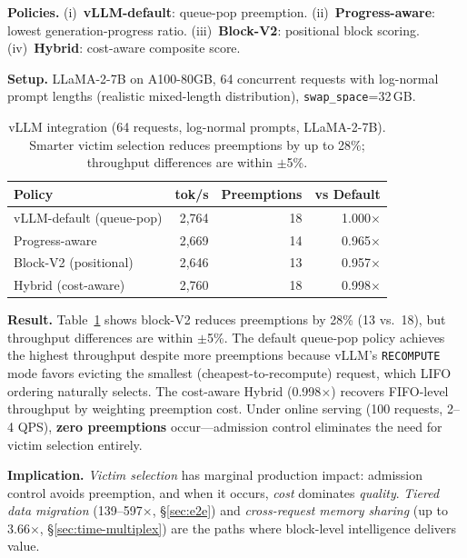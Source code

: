 \documentclass[conference]{IEEEtran}
\begin{document}
\textbf{Policies.} (i)~\textbf{vLLM-default}: queue-pop preemption. (ii)~\textbf{Progress-aware}: lowest generation-progress ratio. (iii)~\textbf{Block-V2}: positional block scoring. (iv)~\textbf{Hybrid}: cost-aware composite score.

\textbf{Setup.} LLaMA-2-7B on A100-80GB, 64 concurrent requests with log-normal prompt lengths (realistic mixed-length distribution), \texttt{swap\_space}=32\,GB.

\begin{table}[t]
\centering
\caption{vLLM integration (64 requests, log-normal prompts, LLaMA-2-7B). Smarter victim selection reduces preemptions by up to 28\%; throughput differences are within $\pm$5\%.}
\label{tab:vllm-realistic}
\small
\setlength{\tabcolsep}{8pt}
\begin{tabular}{@{}lrrr@{}}
\toprule
Policy & tok/s & Preemptions & vs Default \\
\midrule
vLLM-default (queue-pop) & 2{,}764 & 18 & 1.000$\times$ \\
Progress-aware          & 2{,}669 & 14 & 0.965$\times$ \\
Block-V2 (positional)   & 2{,}646 & 13 & 0.957$\times$ \\
Hybrid (cost-aware)     & 2{,}760 & 18 & 0.998$\times$ \\
\bottomrule
\end{tabular}
\end{table}

\textbf{Result.} Table~\ref{tab:vllm-realistic} shows block-V2 reduces preemptions by 28\% (13 vs.\ 18), but throughput differences are within $\pm$5\%. The default queue-pop policy achieves the highest throughput despite more preemptions because vLLM's \texttt{RECOMPUTE} mode favors evicting the smallest (cheapest-to-recompute) request, which LIFO ordering naturally selects. The cost-aware Hybrid (0.998$\times$) recovers FIFO-level throughput by weighting preemption cost. Under online serving (100 requests, 2--4 QPS), \textbf{zero preemptions} occur---admission control eliminates the need for victim selection entirely.

\textbf{Implication.} \emph{Victim selection} has marginal production impact: admission control avoids preemption, and when it occurs, \emph{cost} dominates \emph{quality}. \emph{Tiered data migration} (139--597$\times$, \S\ref{sec:e2e}) and \emph{cross-request memory sharing} (up to 3.66$\times$, \S\ref{sec:time-multiplex}) are the paths where block-level intelligence delivers value.
\end{document}

